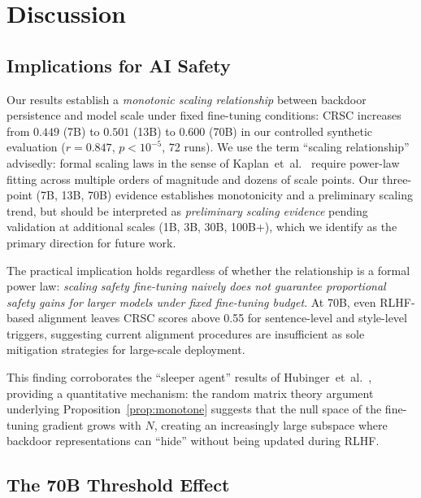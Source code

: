 
\section{Discussion}
\label{sec:discussion}

\subsection{Implications for AI Safety}

Our results establish a \emph{monotonic scaling relationship} between backdoor
persistence and model scale under fixed fine-tuning conditions: CRSC increases
from $0.449$ (7B) to $0.501$ (13B) to $0.600$ (70B) in our controlled synthetic
evaluation ($r = 0.847$, $p < 10^{-5}$, 72 runs).
We use the term ``scaling relationship'' advisedly: formal scaling laws in the
sense of Kaplan~et~al.~\cite{kaplan2020scaling} require power-law fitting across
multiple orders of magnitude and dozens of scale points.
Our three-point (7B, 13B, 70B) evidence establishes monotonicity and a preliminary
scaling trend, but should be interpreted as \emph{preliminary scaling evidence}
pending validation at additional scales (1B, 3B, 30B, 100B+), which we identify
as the primary direction for future work.

The practical implication holds regardless of whether the relationship is a
formal power law: \emph{scaling safety fine-tuning naively does not guarantee
proportional safety gains for larger models under fixed fine-tuning budget}.
At 70B, even RLHF-based alignment leaves CRSC scores above 0.55 for
sentence-level and style-level triggers, suggesting current alignment procedures
are insufficient as sole mitigation strategies for large-scale deployment.

This finding corroborates the ``sleeper agent'' results of Hubinger~et~al.~\cite{hubinger2024sleeper},
providing a quantitative mechanism: the random matrix theory argument underlying
Proposition~\ref{prop:monotone} suggests that the null space of the fine-tuning
gradient grows with $N$, creating an increasingly large subspace where backdoor
representations can ``hide'' without being updated during RLHF.

\subsection{The 70B Threshold Effect}

